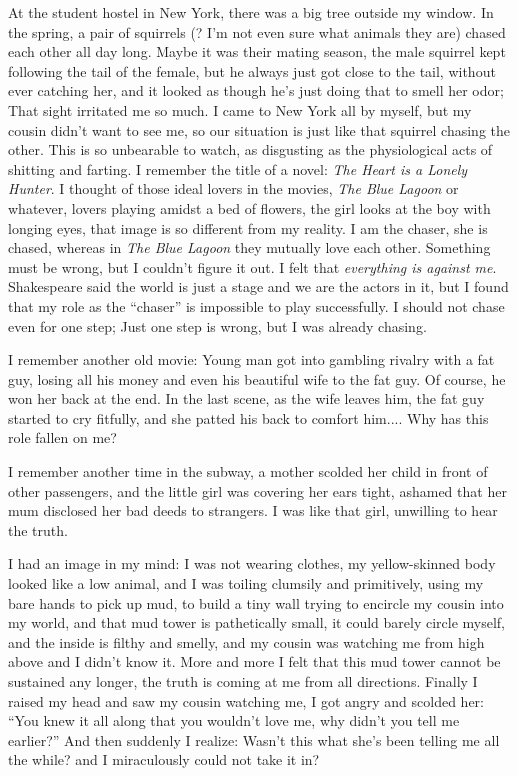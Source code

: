 \documentclass[12pt]{report}
\begin{document}
{
At the student hostel in New York, there was a big tree outside my window.  In the spring, a pair of squirrels (? I'm not even sure what animals they are) chased each other all day long.  Maybe it was their mating season, the male squirrel kept following the tail of the female, but he always just got close to the tail, without ever catching her, and it looked as though he's just doing that to smell her odor;  That sight irritated me so much.  I came to New York all by myself, but my cousin didn't want to see me, so our situation is just like that squirrel chasing the other.  This is so unbearable to watch, as disgusting as the physiological acts of shitting and farting.  I remember the title of a novel:  \textit{The Heart is a Lonely Hunter}.  I thought of those ideal lovers in the movies, \textit{The Blue Lagoon} or whatever, lovers playing amidst a bed of flowers, the girl looks at the boy with longing eyes, that image is so different from my reality.  I am the chaser, she is chased, whereas in \textit{The Blue Lagoon} they mutually love each other.  Something must be wrong, but I couldn't figure it out.  I felt that \textit{everything is against me}.  Shakespeare said the world is just a stage and we are the actors in it, but I found that my role as the ``chaser'' is impossible to play successfully.  I should not chase even for one step; Just one step is wrong, but I was already chasing.

I remember another old movie:  Young man got into gambling rivalry with a fat guy, losing all his money and even his beautiful wife to the fat guy.  Of course, he won her back at the end.  In the last scene, as the wife leaves him, the fat guy started to cry fitfully, and she patted his back to comfort him....  Why has this role fallen on me?

I remember another time in the subway, a mother scolded her child in front of other passengers, and the little girl was covering her ears tight, ashamed that her mum disclosed her bad deeds to strangers.  I was like that girl, unwilling to hear the truth.

I had an image in my mind:  I was not wearing clothes, my yellow-skinned body looked like a low animal, and I was toiling clumsily and primitively, using my bare hands to pick up mud, to build a tiny wall trying to encircle my cousin into my world, and that mud tower is pathetically small, it could barely circle myself, and the inside is filthy and smelly, and my cousin was watching me from high above and I didn't know it.  More and more I felt that this mud tower cannot be sustained any longer, the truth is coming at me from all directions.  Finally I raised my head and saw my cousin watching me, I got angry and scolded her: ``You knew it all along that you wouldn't love me, why didn't you tell me earlier?''  And then suddenly I realize:  Wasn't this what she's been telling me all the while?  and I miraculously could not take it in?

}
\end{document}
